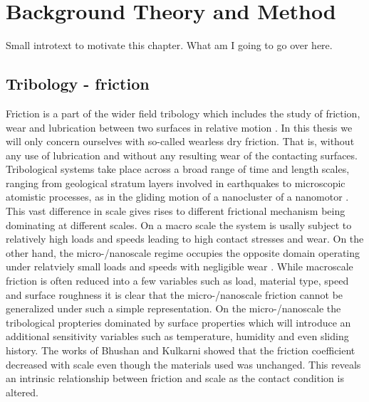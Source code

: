 \newpage
\chapter{Background Theory and Method}

Small introtext to motivate this chapter. What am I going to go over here.








\section{Tribology - friction}
Friction is a part of the wider field tribology which includes the study of
friction, wear and lubrication between two surfaces in relative motion \cite[p.
1]{gnecco_meyer_2015}. In this thesis we will only concern ourselves with so-called wearless dry friction. That is, without any use of lubrication and without any resulting wear of the contacting surfaces. Tribological systems take place across a broad
range of time and length scales, ranging from geological stratum layers involved
in earthquakes \cite{kim_nano-scale_2009} to microscopic atomistic processes, as
in the gliding motion of a nanocluster of a nanomotor \cite{Manini_2016}. This
vast difference in scale gives rises to different frictional mechanism being
dominating at different scales. On a macro scale the system is usally subject
to relatively high loads and speeds leading to high contact stresses and
wear. On the other hand, the micro-/nanoscale regime occupies the opposite domain operating under relatviely small loads and speeds with negligible wear \cite{kim_nano-scale_2009} \cite[p. 5]{bhushan_2013}. While macroscale friction is often reduced into a few variables such as load, material type, speed and surface roughness it is clear that the micro-/nanoscale friction cannot be generalized under such a simple representation. On the micro-/nanoscale the tribological propteries dominated by surface properties which will introduce an additional sensitivity variables such as temperature, humidity and even sliding history. The works of Bhushan and Kulkarni \cite[(1996)]{BHUSHAN199649} showed that the friction coefficient decreased with scale even though the materials used was unchanged. This reveals an intrinsic relationship between friction and scale as the contact condition is altered.

